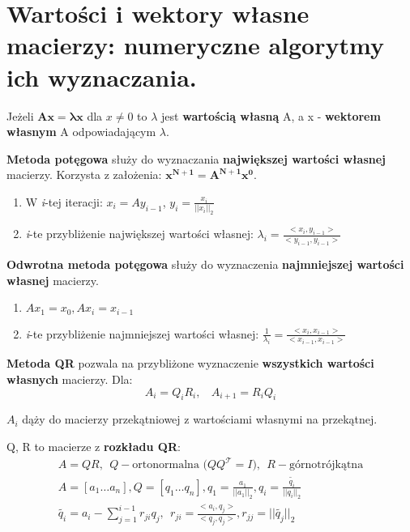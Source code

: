 \documentclass[main.tex]{subfiles}
\begin{document}
    \newpage


    \section{Wartości i wektory własne macierzy: numeryczne algorytmy ich wyznaczania.}
    \begin{definition}
        Jeżeli $\mathbf{Ax = \lambda x}$ dla $x \neq 0$ to $\lambda$ jest \textbf{wartością własną} A, a x -
        \textbf{wektorem własnym} A odpowiadającym $\lambda$.
    \end{definition}

    \begin{definition}
        \textbf{Metoda potęgowa} służy do wyznaczania \textbf{największej wartości własnej} macierzy. Korzysta z założenia:
        $\mathbf{x^{N+1} = A^{N+1} x^0}$.

        \begin{enumerate}
            \item W \textit{i}-tej iteracji: $x_i = Ay_{i-1}$, $y_i = \frac{x_i}{||x_i||_2}$
            \item \textit{i}-te przybliżenie największej wartości własnej: $\lambda_i = \frac{<x_i, y_{i-1}>}{<y_{i-1}, y_{i-1}>}$
        \end{enumerate}
    \end{definition}

    \begin{definition}
        \textbf{Odwrotna metoda potęgowa} służy do wyznaczenia \textbf{najmniejszej wartości własnej} macierzy.
        \begin{enumerate}
            \item $Ax_1 = x_0, Ax_i = x_{i-1}$
            \item \textit{i}-te przybliżenie najmniejszej wartości własnej: $\frac{1}{\lambda_i} = \frac{<x_i, x_{i-1}>}{<x_{i-1}, x_{i-1}>}$
        \end{enumerate}
    \end{definition}

    \begin{definition}
        \textbf{Metoda QR}  pozwala na przybliżone wyznaczenie \textbf{wszystkich wartości własnych} macierzy. Dla:
        \[A_i = Q_i R_i, ~~~~ A_{i+1} = R_i Q_i\]

        $A_i$ dąży do macierzy przekątniowej z wartościami własnymi na przekątnej.

        Q, R to macierze z \textbf{rozkładu QR}:
        \begin{gather*}
            A = QR, ~~ Q - \text{ortonormalna ($QQ^\mathcal{T}=I$)}, ~~ R - \text{górnotrójkątna}\\
            A = [a_1 \dots a_n], Q = [q_1 \dots q_n], q_1 = \frac{a_1}{||a_1||_2}, q_i = \frac{\tilde{q_i}}{||q_i||_2}\\
            \tilde{q_i} = a_i - \sum_{j=1}^{i-1} r_{ji} q_j, ~~ r_{ji} = \frac{<a_i, q_j>}{<q_j, q_j>}, r_{jj} = ||\tilde{q_j}||_2
        \end{gather*}
    \end{definition}
\end{document}
